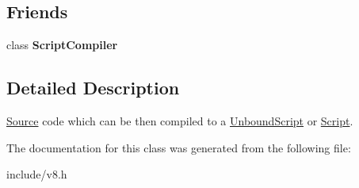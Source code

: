\subsection*{Friends}
\begin{DoxyCompactItemize}
\item 
class {\bfseries Script\+Compiler}\hypertarget{classv8_1_1_script_compiler_1_1_source_a1cb50af99960b4c11eaee7347e034f51}{}\label{classv8_1_1_script_compiler_1_1_source_a1cb50af99960b4c11eaee7347e034f51}

\end{DoxyCompactItemize}


\subsection{Detailed Description}
\hyperlink{classv8_1_1_script_compiler_1_1_source}{Source} code which can be then compiled to a \hyperlink{classv8_1_1_unbound_script}{Unbound\+Script} or \hyperlink{classv8_1_1_script}{Script}. 

The documentation for this class was generated from the following file\+:\begin{DoxyCompactItemize}
\item 
include/v8.\+h\end{DoxyCompactItemize}
